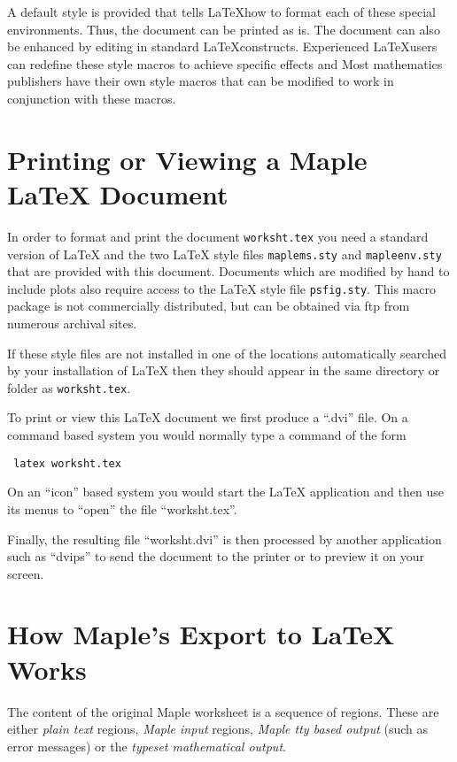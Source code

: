 {A default style is provided that tells \LaTeX how
to format each of these special environments.
Thus, the document can be printed as is.
The document can also be enhanced by editing
in standard \LaTeX constructs.
Experienced \LaTeX users can redefine these
style macros to achieve specific effects and
Most mathematics publishers have their own style macros
that can be modified to work in conjunction with these
macros.



\section{Printing or Viewing a Maple \LaTeX{} Document}
In order to format and print the document {\tt worksht.tex} 
you need a standard version of \LaTeX{} and the two 
\LaTeX{} style files {\tt maplems.sty} and {\tt mapleenv.sty}
that are provided with this document.  Documents which
are modified by hand to include plots also require access to
the \LaTeX{} style file {\tt psfig.sty}.  This macro package
is not commercially distributed, but can be obtained via
ftp from numerous archival sites.

If these style files are not installed in one of the locations
automatically searched by your installation of \LaTeX{} then they 
should appear in the same directory or folder as {\tt worksht.tex}.

To print or view this \LaTeX{} document we first 
produce a ``.dvi'' file.  
On a command based system you would normally type a 
command of the form

{\tt \hspace*{10ex} latex worksht.tex}

On an ``icon'' based system you would start the \LaTeX{} application
and then use its menus to ``open'' the file ``worksht.tex''.

Finally, the resulting file ``worksht.dvi'' is then processed by 
another application such as ``dvips'' to send the document 
to the printer or to preview it on your screen.

\section{How Maple's Export to \LaTeX{} Works}

The content of the original Maple worksheet is 
a sequence of regions.  These are either {\em plain text}
regions, {\em Maple input} regions, {\em Maple tty based output}
(such as error messages) or the 
{\em typeset mathematical output}.

}
